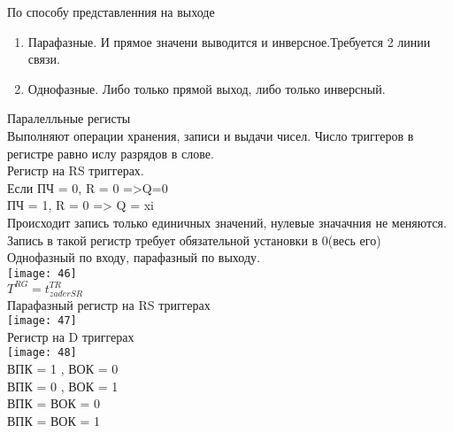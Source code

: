 По способу представленния на выходе\\
\begin{enumerate}
  \item Парафазные.
  И прямое значени выводится и инверсное.Требуется 2 линии связи.
  \item Однофазные.
  Либо только прямой выход, либо только инверсный.
\end{enumerate}


Паралелльные регисты\\
Выполняют операции хранения, записи и выдачи чисел. Число триггеров в регистре равно ислу разрядов в слове.\\

Регистр на RS триггерах.\\
Если ПЧ = 0, R = 0 =>Q=0\\
ПЧ = 1, R = 0 => Q = xi\\
Происходит запись только единичных значений, нулевые значачния не меняются. \\
Запись в такой регистр требует обязательной установки в 0(весь его)\\
Однофазный по входу, парафазный по выходу.\\

\texttt{[image: 46]}\\

$T^{RG}=  t^{TR}_{zaderSR}$ \\



Парафазный регистр на RS триггерах \\
\texttt{[image: 47]}\\


\newpage
Регистр на D триггерах\\
\texttt{[image: 48]}\\

ВПК = 1 , ВОК = 0\\
ВПК = 0 , ВОК = 1\\
ВПК =  ВОК = 0\\
ВПК =  ВОК = 1\\
